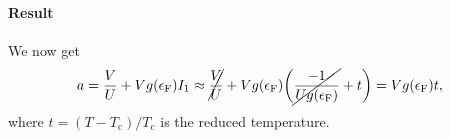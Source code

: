\documentclass[11pt,letter, swedish, english
]{article}
\newcommand{\Tc}{\ensuremath{T_{\text{c}}}}
\newcommand{\eF}{\ensuremath{\epsilon_{\text{F}}}}
\begin{document}

\paragraph{Result}
We now get
\begin{equation}\label{eq:2_a}
a=\frac{V}{U}+Vg(\eF)I_1
\approx\cancel{\frac{V}{U}}+
Vg(\eF)\qty(\cancel{\frac{-1}{Ug(\eF)}}+t)
=Vg(\eF)t,
\end{equation}
where $t=(T-\Tc)/\Tc$ is the reduced temperature.
\end{document}
